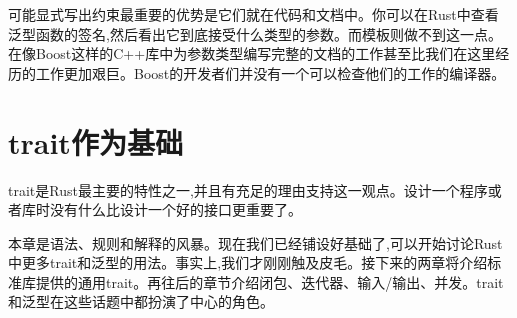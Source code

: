 可能显式写出约束最重要的优势是它们就在代码和文档中。你可以在Rust中查看泛型函数的签名,然后看出它到底接受什么类型的参数。而模板则做不到这一点。在像Boost这样的C++库中为参数类型编写完整的文档的工作甚至比我们在这里经历的工作更加艰巨。Boost的开发者们并没有一个可以检查他们的工作的编译器。

\section{trait作为基础}

trait是Rust最主要的特性之一,并且有充足的理由支持这一观点。设计一个程序或者库时没有什么比设计一个好的接口更重要了。

本章是语法、规则和解释的风暴。现在我们已经铺设好基础了,可以开始讨论Rust中更多trait和泛型的用法。事实上,我们才刚刚触及皮毛。接下来的两章将介绍标准库提供的通用trait。再往后的章节介绍闭包、迭代器、输入/输出、并发。trait和泛型在这些话题中都扮演了中心的角色。
